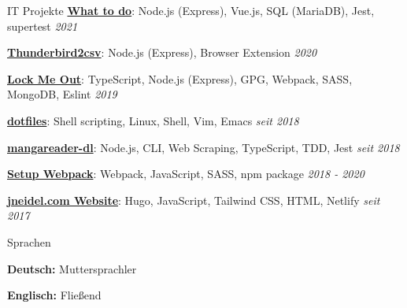 \documentclass{cv}
\begin{document}
\begin{rSection}{IT Projekte}
\textbf{\href{https://github.com/jneidel/what-to-do}{What to do}}: Node.js (Express), Vue.js, SQL (MariaDB), Jest, supertest
  \hfill
  {\em 2021}

  \textbf{\href{https://github.com/jneidel/yoga-vidya-thunderbird2csv-add-on}{Thunderbird2csv}}: Node.js (Express), Browser Extension
  \hfill
  {\em 2020}

  \textbf{\href{https://github.com/jneidel/lock-me-out}{Lock Me Out}}: TypeScript, Node.js (Express), GPG, Webpack, SASS, MongoDB, Eslint
  \hfill
  {\em 2019}

  \textbf{\href{https://github.com/jneidel/dotfiles}{dotfiles}}: Shell scripting, Linux, Shell, Vim, Emacs
  \hfill
  {\em seit 2018}

  \textbf{\href{https://github.com/jneidel/mangareader-dl}{mangareader-dl}}: Node.js, CLI, Web Scraping, TypeScript, TDD, Jest
  \hfill
  {\em seit 2018}

  \textbf{\href{https://github.com/jneidel/setup-webpack}{Setup Webpack}}: Webpack, JavaScript, SASS, npm package
  \hfill
  {\em 2018 - 2020}

 \textbf{\href{https://github.com/jneidel/jneidel.com}{jneidel.com Website}}: Hugo, JavaScript, Tailwind CSS, HTML, Netlify
  \hfill
  {\em seit 2017}
\end{rSection}

  \pagebreak

\begin{rSection}{Sprachen}
  \begin{minipage}[l]{0.48\linewidth}
    {\bf Deutsch:} Muttersprachler
  \end{minipage}
  \begin{minipage}[l]{0.48\linewidth}
    {\bf Englisch:} Fließend \hfill
  \end{minipage}
\end{rSection}
\end{document}
